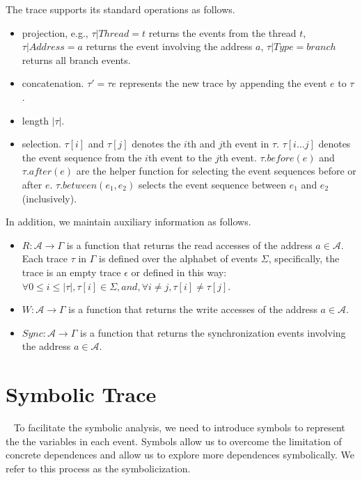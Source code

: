 The trace supports its standard operations as follows.
\begin{itemize}
\item projection, e.g., $\tau|Thread=t$ returns the events from the thread $t$,  $\tau|Address=a$ returns the event involving the address $a$, $\tau|Type=branch$ returns all branch events.  
\item concatenation. $\tau'=\tau e$ represents the new trace by appending the event $e$ to $\tau$.
\item length $|\tau|$. 
\item selection. $\tau[i]$ and $\tau[j]$ denotes the $i$th and $j$th event in $\tau$. $\tau[i\dots j]$ denotes the event sequence from the $i$th event to the $j$th event. $\tau.before(e)$ and $\tau.after(e)$ are the helper function for selecting the event sequences before or after $e$. $\tau.between(e_1, e_2)$  selects the event sequence between $e_1$ and $e_2$ (inclusively). 
\end{itemize}



In addition, we maintain auxiliary information as follows.
\begin{itemize}
\item $R: \mathcal{A} \rightarrow \Gamma$ is a function that returns the read accesses of the address $a\in \mathcal{A}$. Each trace $\tau$ in $\Gamma$ is defined over the alphabet of events $\Sigma$, specifically, the trace is an empty trace $\epsilon$ or defined in this way:  $\forall 0\leq i\leq |\tau|,   \tau[i]\in \Sigma, and, \forall i\neq j, \tau[i]\neq \tau[j]$. 
\item $W: \mathcal{A} \rightarrow \Gamma$ is a function that returns the write accesses of the address $a \in \mathcal{A}$.
\item $Sync: \mathcal{A} \rightarrow \Gamma$ is a function that returns the synchronization events involving the address $a\in \mathcal{A}$. 
\end{itemize}


\section{Symbolic Trace}~\label{sec:symtrace}
To facilitate the symbolic analysis, we need to introduce symbols to represent the the variables in each event. Symbols allow us to overcome the limitation of concrete dependences and allow us to explore more dependences symbolically. We refer to this process as the symbolicization.

